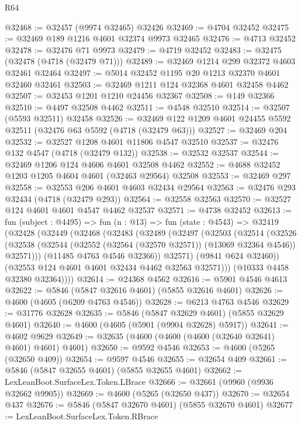 \begin{lexlean}{R64}
\begin{coremodule}
@32468 := @32457 (@9974 @32465) @32426
@32469 := @4704 @32452
@32475 := @32469 @189 @1216 @4601 @32374 @9973 @32465
@32476 := @4713 @32452
@32478 := @32476 @71 @9973
@32479 := @4719 @32452
@32483 := @32475 (@32478 (@4718 (@32479 @71)))
@32489 := @32469 @1214 @299 @32372 @4603 @32461 @32464
@32497 := @5014 @32452 @1195 @20 @1213 @32370 @4601 @32460 @32461
@32503 := @32469 @1211 @124 @32368 @4601 @32458 @4462
@32507 := @32453 @1201 @1210 @24456 @32367
@32508 := @149 @32366
@32510 := @4497 @32508 @4462
@32511 := @4548 @32510
@32514 := @32507 (@5593 @32511) @32458
@32526 := @32469 @122 @1209 @4601 @24455 @5592 @32511 (@32476 @63 @5592 (@4718 (@32479 @63)))
@32527 := @32469 @204
@32532 := @32527 @1208 @4601 @11806 @4547 @32510
@32537 := @32476 @132 @4547 (@4718 (@32479 @132))
@32538 := @32532 @32537
@32544 := @32469 @1206 @124 @4606 @4601 @32508 @4462
@32552 := @4688 @32452 @1203 @1205 @4604 @4601 (@32463 @29564) @32508
@32553 := @32469 @297
@32558 := @32553 @206 @4601 @4603 @32434 @29564
@32563 := @32476 @293 @32434 (@4718 (@32479 @293))
@32564 := @32558 @32563
@32570 := @32527 @124 @4601 @4601 @4547 @4462 @32537
@32571 := @4738 @32452
@32613 := fun (subject : @4495) =>
  fun (n : @13) =>
  fun (state : @4543) =>
  @32419
    (@32428
      (@32449
        (@32468
          (@32483
            (@32489
              (@32497
                (@32503
                  (@32514
                    (@32526
                      (@32538
                        (@32544 (@32552 (@32564 (@32570 @32571)) (@13069 @32364 @4546)) @32571)))
                    (@11485 @4763 @4546 @32366))
                  @32571)
                (@9841 @624 @32460))
              (@32553 @124 @4601 @4601 @32434 @4462 @32563 @32571)))
          (@10333 @4458 @32380 @32364))))
@32614 := @24368 @4562
@32616 := @5901 @4546 @4613
@32622 := @5846 (@5847 @32616 @4601) (@5855 @32616 @4601)
@32626 := @4600 (@4605 (@6209 @4763 @4546))
@32628 := @6213 @4763 @4546
@32629 := @31776 @32628
@32635 := @5846 (@5847 @32629 @4601) (@5855 @32629 @4601)
@32640 := @4600 (@4605 (@5901 (@9904 @32628) @5917))
@32641 := @4602 @9629
@32649 := @32635 (@4600 (@4600 (@4600 (@32640 @32641) @4601) @4601) @4601)
@32650 := @9592 @4546
@32653 := @4600 (@5265 (@32650 @409))
@32654 := @9597 @4546
@32655 := @32654 @409
@32661 := @5846 (@5847 @32655 @4601) (@5855 @32655 @4601)
@32662 := LexLeanBoot.SurfaceLex.Token.LBrace
@32666 := @32661 (@9960 (@9936 @32662 @9905))
@32669 := @4600 (@5265 (@32650 @437))
@32670 := @32654 @437
@32676 := @5846 (@5847 @32670 @4601) (@5855 @32670 @4601)
@32677 := LexLeanBoot.SurfaceLex.Token.RBrace

\end{coremodule}
\end{lexlean}
